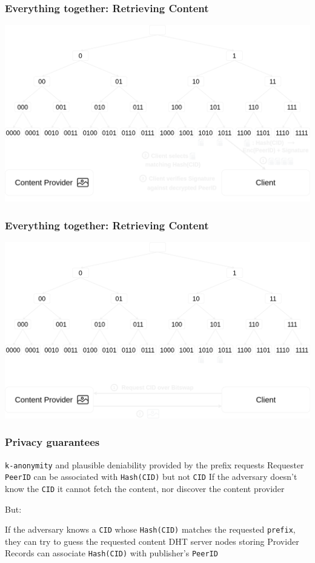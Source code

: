 \documentclass{pl-slide}
\begin{document}
\begin{frame}
\frametitle{Everything together: Retrieving Content}
\begin{minipage}[b]{\linewidth}
\begin{center}
	\includegraphics[width=.8\linewidth,keepaspectratio]{resources/dht/dht-private-provider-record-fetch.png}
\end{center}
\end{minipage}
\end{frame}

\begin{frame}
\frametitle{Everything together: Retrieving Content}
\begin{minipage}[b]{\linewidth}
\begin{center}
	\includegraphics[width=.8\linewidth,keepaspectratio]{resources/dht/dht-private-bitswap-request.png}
\end{center}
\end{minipage}
\end{frame}



\begin{frame}
\frametitle{Privacy guarantees}
\begin{itemize}
	\itemc \texttt{k-anonymity} and plausible deniability provided by the prefix requests
	\itemc Requester \texttt{PeerID} can be associated with \texttt{Hash(CID)} but not \texttt{CID}
	\itemc If the adversary doesn't know the \texttt{CID} it cannot fetch the content, nor discover the content provider \\
\end{itemize}
{\large But:}
\begin{itemize}
	\bigskip
	\itemc If the adversary knows a \texttt{CID} whose \texttt{Hash(CID)} matches the requested \texttt{prefix}, they can try to guess the requested content
	\itemc DHT server nodes storing Provider Records can associate \texttt{Hash(CID)} with publisher's \texttt{PeerID}
\end{itemize}
\end{frame}
\end{document}
